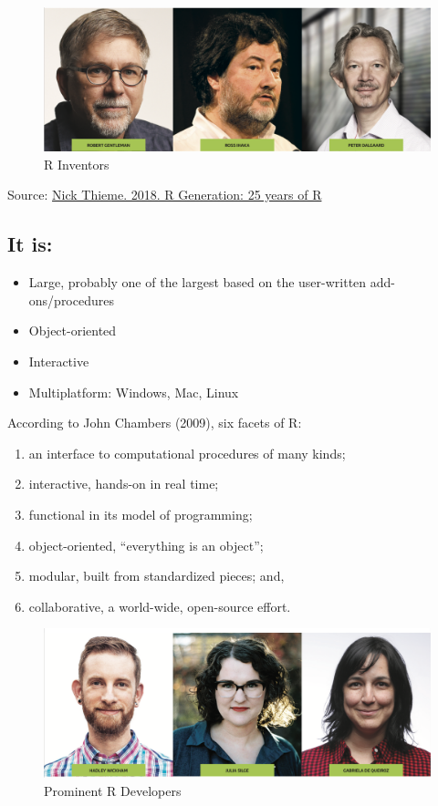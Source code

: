 \documentclass[]{book}
\providecommand{\tightlist}{%
  \setlength{\itemsep}{0pt}\setlength{\parskip}{0pt}}
\begin{document}
\begin{figure}
\includegraphics[width=1\linewidth]{Rinventors} \caption{R Inventors}\label{fig:Rinventors}
\end{figure}

Source: \href{https://rss.onlinelibrary.wiley.com/doi/10.1111/j.1740-9713.2018.01169.x}{Nick Thieme. 2018. R Generation: 25 years of R}

\hypertarget{it-is}{%
\subsection{It is:}\label{it-is}}

\begin{itemize}
\tightlist
\item
  Large, probably one of the largest based on the user-written add-ons/procedures
\item
  Object-oriented
\item
  Interactive
\item
  Multiplatform: Windows, Mac, Linux
\end{itemize}

According to John Chambers (2009), six facets of R:

\begin{enumerate}
\def\labelenumi{\arabic{enumi}.}
\tightlist
\item
  an interface to computational procedures of many kinds;
\item
  interactive, hands-on in real time;
\item
  functional in its model of programming;
\item
  object-oriented, ``everything is an object'';
\item
  modular, built from standardized pieces; and,
\item
  collaborative, a world-wide, open-source effort.
\end{enumerate}

\begin{figure}
\includegraphics[width=1\linewidth]{Rdevelopers} \caption{Prominent R Developers}\label{fig:Rdevelopers}
\end{figure}
\end{document}
